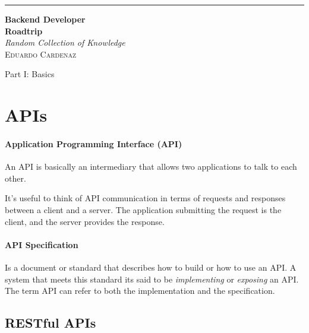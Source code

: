 \documentclass[a4paper]{article}
\begin{document}
    \begin{titlepage}
        \raggedleft
        \rule{1pt}{\textheight}
        \hspace{0.05\textwidth}
        \parbox[b]{0.75\textwidth}{
            {\Huge\bfseries \textcolor[HTML]{2A202C}{Backend Developer}\\[0.5\baselineskip] \textcolor[HTML]{2A202C}{Roadtrip}}\\[2\baselineskip]
            {\large\textit{\textcolor[HTML]{2A202C}{Random Collection of Knowledge}}}\\[4\baselineskip]
            {\Large\textsc{\textcolor[HTML]{2A202C}{Eduardo Cardenaz}}}
            
            \vspace{0.5\textheight}
        }
    \end{titlepage}

    \thispagestyle{empty} %
    \vspace*{\fill}
    \begin{center}
        \Huge Part I: Basics
    \end{center}
    \vspace*{\fill}
    \newpage

    \section{APIs}
    \paragraph*{Application Programming Interface (API)} An API is basically an intermediary that allows two applications to talk to each other. 

    It's useful to think of API communication in terms of requests and responses between a client and a server. The application submitting the request is the client, and the server provides the response.

    \paragraph{API Specification} Is a document or standard that describes how to build or how to use an API. A system that meets this standard its said to be \textit{implementing} or \textit{exposing} an API. The term API can refer to both the implementation and the specification.

    \subsection{RESTful APIs}
    
\end{document}
